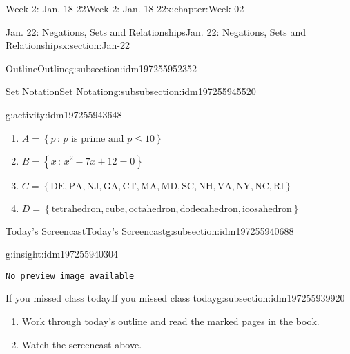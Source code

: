 \documentclass[oneside,10pt,]{book}
\newcommand{\mono}[1]{\texttt{#1}}
\numberwithin{equation}{section}
\newlength{\qrsize}
\newlength{\previewwidth}
\renewcommand{\le}{\leqslant}
\newcommand{\set}[1]{\left\{ {#1} \right\}}
\newcommand{\setof}[2]{{\left\{#1\,\colon\,#2\right\}}}
\begin{document}
\begin{chapterptx}{Week 2: Jan. 18-22}{}{Week 2: Jan. 18-22}{}{}{x:chapter:Week-02}
\begin{sectionptx}{Jan. 22: Negations, Sets and Relationships}{}{Jan. 22: Negations, Sets and Relationships}{}{}{x:section:Jan-22}
\begin{subsectionptx}{Outline}{}{Outline}{}{}{g:subsection:idm197255952352}
\begin{subsubsectionptx}{Set Notation}{}{Set Notation}{}{}{g:subsubsection:idm197255945520}
\begin{activity}{}{g:activity:idm197255943648}
%
\begin{enumerate}
\item{}\(\displaystyle A = \setof{p}{p\text{ is prime and } p \le 10}\)%
\item{}\(\displaystyle B = \setof{x}{x^2-7x+12=0}\)%
\item{}\(\displaystyle C = \set{\text{DE},\text{PA},\text{NJ},\text{GA},\text{CT},\text{MA},\text{MD},\text{SC},\text{NH},\text{VA},\text{NY},\text{NC},\text{RI}}\)%
\item{}\(\displaystyle D= \set{\text{tetrahedron},\text{cube},\text{octahedron},\text{dodecahedron},\text{icosahedron}}\)%
\end{enumerate}
\end{activity}%
\end{subsubsectionptx}
\end{subsectionptx}
%
%
\typeout{************************************************}
\typeout{************************************************}
%
\begin{subsectionptx}{Today's Screencast}{}{Today's Screencast}{}{}{g:subsection:idm197255940688}
\begin{insight}{}{g:insight:idm197255940304}%
\setlength{\qrsize}{9em}
\setlength{\previewwidth}{\linewidth}
\addtolength{\previewwidth}{-\qrsize}
\begin{tcbraster}[raster columns=2, raster column skip=1pt, raster halign=center, raster force size=false, raster left skip=0pt, raster right skip=0pt]%
\begin{tcolorbox}[previewstyle, width=\previewwidth]%
\mono{No preview image available}%
\end{tcolorbox}%
\begin{tcolorbox}[qrstyle]%
[QR LINK]\end{tcolorbox}%
\end{tcbraster}%
\end{insight}
\end{subsectionptx}
%
%
\typeout{************************************************}
\typeout{************************************************}
%
\begin{subsectionptx}{If you missed class today}{}{If you missed class today}{}{}{g:subsection:idm197255939920}
%
\begin{enumerate}
\item{}Work through today's outline and read the marked pages in the book.%
\item{}Watch the screencast above.%

\end{enumerate}
\end{subsectionptx}
\end{sectionptx}
\end{chapterptx}
\end{document}
